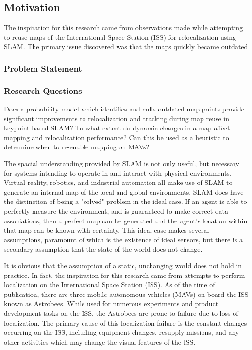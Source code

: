 \subsection{Motivation}

The inspiration for this research came from observations made while attempting to reuse maps of the International Space Station (ISS) for relocalization using SLAM. The primary issue discovered was that the maps quickly became outdated 

\subsubsection{Problem Statement}

\subsubsection{Research Questions}

Does a probability model which identifies and culls outdated map points provide significant improvements to relocalization and tracking during map reuse in keypoint-based SLAM?
To what extent do dynamic changes in a map affect mapping and relocalization performance?
Can this be used as a heuristic to determine when to re-enable mapping on MAVs?

The spacial understanding provided by SLAM is not only useful, but necessary for systems intending to operate in and interact with physical environments. Virtual reality, robotics, and industrial automation all make use of SLAM to generate an internal map of the local and global environments. SLAM does have the distinction of being a "solved" problem in the ideal case. If an agent is able to perfectly measure the environment, and is guaranteed to make correct data associations, then a perfect map can be generated and the agent's location within that map can be known with certainty. This ideal case makes several assumptions, paramount of which is the existence of ideal sensors, but there is a secondary assumption that the state of the world does not change.

It is obvious that the assumption of a static, unchanging world does not hold in practice. In fact, the inspiration for this research came from attempts to perform localization on the International Space Station (ISS). As of the time of publication, there are three mobile autonomous vehicles (MAVs) on board the ISS known as Astrobees. While used for numerous experiments and product development tasks on the ISS, the Astrobees are prone to failure due to loss of localization. The primary cause of this localization failure is the constant changes occurring on the ISS, including equipment changes, resupply missions, and any other activities which may change the visual features of the ISS.

